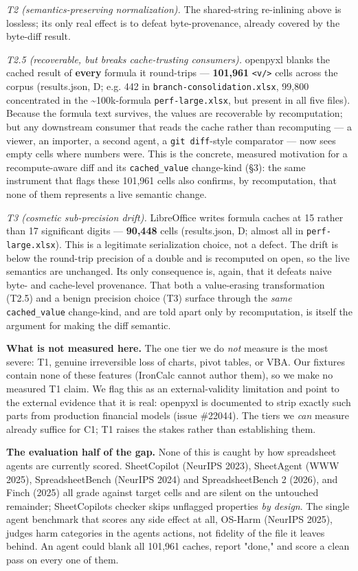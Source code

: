 \documentclass[
]{article}
\newcounter{none} %
\begin{document}
\emph{T2 (semantics-preserving normalization).} The shared-string
re-inlining above is lossless; its only real effect is to defeat
byte-provenance, already covered by the byte-diff result.

\emph{T2.5 (recoverable, but breaks cache-trusting consumers).} openpyxl
blanks the cached result of \textbf{every} formula it round-trips ---
\textbf{101,961} \texttt{\textless{}v/\textgreater{}} cells across the
corpus (results.json, D; e.g. 442 in \texttt{branch-consolidation.xlsx},
99,800 concentrated in the \textasciitilde100k-formula
\texttt{perf-large.xlsx}, but present in all five files). Because the
formula text survives, the values are recoverable by recomputation; but
any downstream consumer that reads the cache rather than recomputing ---
a viewer, an importer, a second agent, a \texttt{git\ diff}-style
comparator --- now sees empty cells where numbers were. This is the
concrete, measured motivation for a recompute-aware diff and its
\texttt{cached\_value} change-kind (§3): the same instrument that flags
these 101,961 cells also confirms, by recomputation, that none of them
represents a live semantic change.

\emph{T3 (cosmetic sub-precision drift).} LibreOffice writes formula
caches at 15 rather than 17 significant digits --- \textbf{90,448} cells
(results.json, D; almost all in \texttt{perf-large.xlsx}). This is a
legitimate serialization choice, not a defect. The drift is below the
round-trip precision of a double and is recomputed on open, so the live
semantics are unchanged. Its only consequence is, again, that it defeats
naive byte- and cache-level provenance. That both a value-erasing
transformation (T2.5) and a benign precision choice (T3) surface through
the \emph{same} \texttt{cached\_value} change-kind, and are told apart
only by recomputation, is itself the argument for making the diff
semantic.

\textbf{What is not measured here.} The one tier we do \emph{not}
measure is the most severe: T1, genuine irreversible loss of charts,
pivot tables, or VBA. Our fixtures contain none of these features
(IronCalc cannot author them), so we make no measured T1 claim. We flag
this as an external-validity limitation and point to the external
evidence that it is real: openpyxl is documented to strip exactly such
parts from production financial models (issue \#22044). The tiers we
\emph{can} measure already suffice for C1; T1 raises the stakes rather
than establishing them.

\textbf{The evaluation half of the gap.} None of this is caught by how
spreadsheet agents are currently scored. SheetCopilot (NeurIPS 2023),
SheetAgent (WWW 2025), SpreadsheetBench (NeurIPS 2024) and
SpreadsheetBench 2 (2026), and Finch (2025) all grade against target
cells and are silent on the untouched remainder;
SheetCopilot\textquotesingle s checker skips unflagged properties
\emph{by design}. The single agent benchmark that scores any side effect
at all, OS-Harm (NeurIPS 2025), judges harm categories in the
agent\textquotesingle s actions, not fidelity of the file it leaves
behind. An agent could blank all 101,961 caches, report "done," and
score a clean pass on every one of them.
\end{document}
